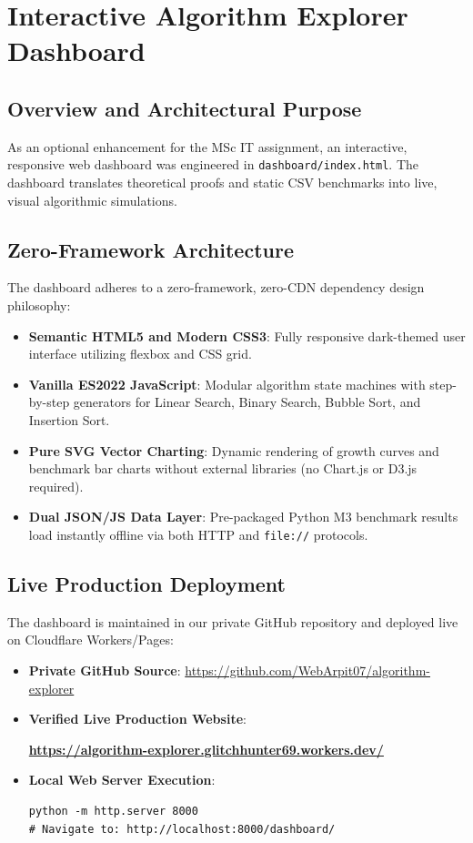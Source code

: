 \documentclass[11pt,a4paper,oneside]{report}
\theoremstyle{definition}
\begin{document}
\chapter{Interactive Algorithm Explorer Dashboard}
\label{chap:web_dashboard}

\section{Overview and Architectural Purpose}
As an optional enhancement for the MSc IT assignment, an interactive, responsive web dashboard was engineered in \texttt{dashboard/index.html}. The dashboard translates theoretical proofs and static CSV benchmarks into live, visual algorithmic simulations.

\section{Zero-Framework Architecture}
The dashboard adheres to a zero-framework, zero-CDN dependency design philosophy:
\begin{itemize}
    \item \textbf{Semantic HTML5 and Modern CSS3}: Fully responsive dark-themed user interface utilizing flexbox and CSS grid.
    \item \textbf{Vanilla ES2022 JavaScript}: Modular algorithm state machines with step-by-step generators for Linear Search, Binary Search, Bubble Sort, and Insertion Sort.
    \item \textbf{Pure SVG Vector Charting}: Dynamic rendering of growth curves and benchmark bar charts without external libraries (no Chart.js or D3.js required).
    \item \textbf{Dual JSON/JS Data Layer}: Pre-packaged Python M3 benchmark results load instantly offline via both HTTP and \texttt{file://} protocols.
\end{itemize}

\section{Live Production Deployment}
The dashboard is maintained in our private GitHub repository and deployed live on Cloudflare Workers/Pages:
\begin{itemize}
    \item \textbf{Private GitHub Source}: \url{https://github.com/WebArpit07/algorithm-explorer}
    \item \textbf{Verified Live Production Website}:
    \begin{center}
        \href{https://algorithm-explorer.glitchhunter69.workers.dev/}{\Large\textbf{https://algorithm-explorer.glitchhunter69.workers.dev/}}
    \end{center}
    \item \textbf{Local Web Server Execution}:
    \begin{verbatim}
python -m http.server 8000
# Navigate to: http://localhost:8000/dashboard/
    \end{verbatim}
\end{itemize}
\end{document}
